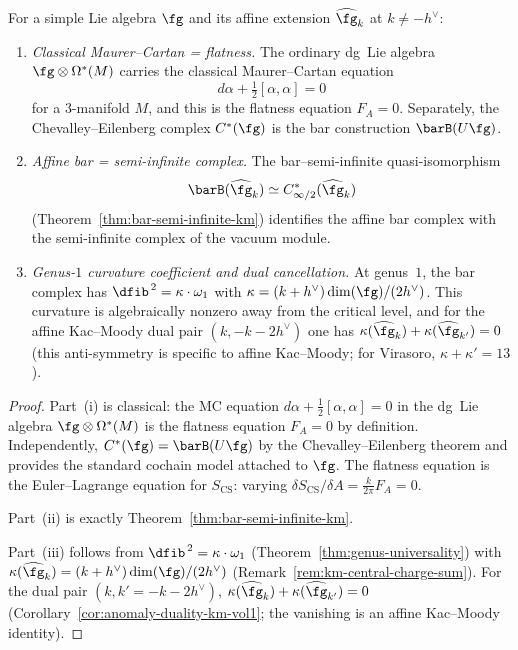 \begin{theorem}\label{thm:cs-koszul-km}
For a simple Lie algebra $\fg$ and its affine extension
$\widehat{\fg}_k$ at $k \neq -h^\vee$:
\begin{enumerate}[label=\textup{(\roman*)}]
\item \emph{Classical Maurer--Cartan = flatness.}
 The ordinary dg~Lie algebra $\fg \otimes \Omega^*(M)$ carries the
 classical Maurer--Cartan equation
 \[
 d\alpha + \tfrac{1}{2}[\alpha, \alpha] = 0
 \]
 for a $3$-manifold $M$, and this is the flatness equation
 $F_A = 0$. Separately, the Chevalley--Eilenberg complex
 $C^*(\fg)$ is the bar construction $\barB(U\fg)$.
\item \emph{Affine bar = semi-infinite complex.}
 The bar--semi-infinite quasi-isomorphism
 \[
 \barB(\widehat{\fg}_k) \simeq
 C^*_{\infty/2}(\widehat{\fg}_k)
 \]
 \textup{(}Theorem~\ref{thm:bar-semi-infinite-km}\textup{)}
 identifies the affine bar complex with the semi-infinite
 complex of the vacuum module.
\item \emph{Genus-$1$ curvature coefficient and dual cancellation.}
 At genus~$1$, the bar complex has $\dfib^{\,2} = \kappa \cdot \omega_1$
 with $\kappa = (k+h^\vee)\dim(\fg)/(2h^\vee)$. This curvature is
 algebraically nonzero away from the critical level, and for the
 affine Kac--Moody dual pair $(k, -k-2h^\vee)$ one has
 $\kappa(\widehat{\fg}_k) + \kappa(\widehat{\fg}_{k'}) = 0$
 \textup{(}this anti-symmetry is specific to affine Kac--Moody;
 for Virasoro, $\kappa + \kappa' = 13$\textup{)}.
\end{enumerate}
\end{theorem}

\begin{proof}
Part~(i) is classical: the MC equation
$d\alpha + \frac{1}{2}[\alpha, \alpha] = 0$ in the dg~Lie algebra
$\fg \otimes \Omega^*(M)$ is the flatness equation $F_A = 0$ by
definition. Independently, $C^*(\fg) = \barB(U\fg)$ by the
Chevalley--Eilenberg theorem and provides the standard cochain
model attached to $\fg$. The flatness equation is the
Euler--Lagrange equation for $S_{\mathrm{CS}}$: varying
$\delta S_{\mathrm{CS}}/\delta A = \frac{k}{2\pi} F_A = 0$.

Part~(ii) is exactly Theorem~\ref{thm:bar-semi-infinite-km}.

Part~(iii) follows from
$\dfib^{\,2} = \kappa \cdot \omega_1$
(Theorem~\ref{thm:genus-universality}) with
$\kappa(\widehat{\fg}_k) = (k+h^\vee)\dim(\fg)/(2h^\vee)$
(Remark~\ref{rem:km-central-charge-sum}). For the dual pair
$(k, k' = -k-2h^\vee)$,
$\kappa(\widehat{\fg}_k) + \kappa(\widehat{\fg}_{k'}) = 0$
\textup{(}Corollary~\ref{cor:anomaly-duality-km-vol1};
the vanishing is an affine Kac--Moody identity\textup{)}.
\end{proof}

